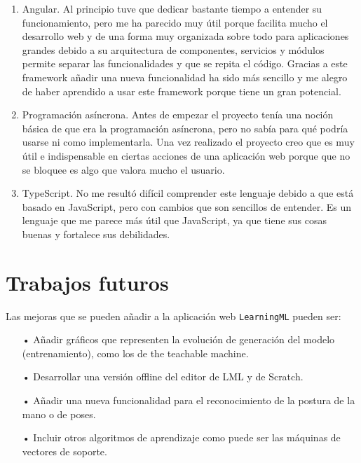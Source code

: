 \documentclass[a4paper, 12pt]{book}
\begin{document}
\begin{enumerate}
  \item Angular. Al principio tuve que dedicar bastante tiempo a entender su funcionamiento, pero me ha parecido muy útil porque facilita mucho el desarrollo web y de una forma muy organizada sobre todo para aplicaciones grandes debido a su arquitectura de componentes, servicios y módulos permite separar las funcionalidades y que se repita el código. Gracias a este framework añadir una nueva funcionalidad ha sido más sencillo y me alegro de haber aprendido a usar este framework porque tiene un gran potencial.
  
  \item Programación asíncrona. Antes de empezar el proyecto tenía una noción básica de que era la programación asíncrona, pero no sabía para qué podría usarse ni como implementarla. Una vez realizado el proyecto creo que es muy útil e indispensable en ciertas acciones de una aplicación web porque que no se bloquee es algo que valora mucho el usuario.
  
  \item TypeScript. No me resultó difícil comprender este lenguaje debido a que está basado en JavaScript, pero con cambios que son sencillos de entender. Es un lenguaje que me parece más útil que JavaScript, ya que tiene sus cosas buenas y fortalece sus debilidades.
\end{enumerate}


\section{Trabajos futuros}
\label{sec:trabajos_futuros}

Las mejoras que se pueden añadir a la aplicación web \texttt{LearningML} pueden ser:

\begin{itemize}
 \item[•] Añadir gráficos que representen la evolución de generación del modelo (entrenamiento), como los de the teachable machine.
 
 \item[•] Desarrollar una versión offline del editor de LML y de Scratch.
 
 \item[•] Añadir una nueva funcionalidad para el reconocimiento de la postura de la mano o de poses.
 
 \item[•] Incluir otros algoritmos de aprendizaje como puede ser las máquinas de vectores de soporte.
 \end{itemize} 
\end{document}
